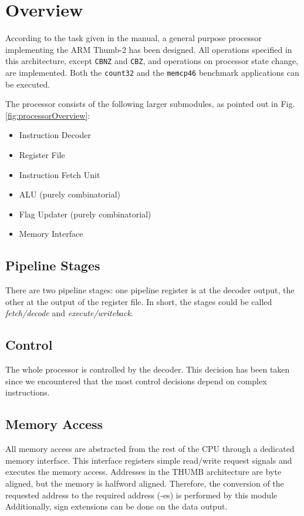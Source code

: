 
\section{Overview}
\label{sec:overview}


According to the task given in the manual, a general purpose processor implementing the ARM Thumb-2 has been designed. All operations specified in this architecture, except \texttt{CBNZ} and \texttt{CBZ}, and operations on processor state change, are implemented. Both the \texttt{count32} and the \texttt{memcp46} benchmark applications can be executed.

The processor consists of the following larger submodules, as pointed out in Fig. \ref{fig:processorOverview}:
\begin{itemize}
\itemsep-1em 
\item Instruction Decoder
\item Register File
\item Instruction Fetch Unit
\item ALU (purely combinatorial)
\item Flag Updater (purely combinatorial)
\item Memory Interface
\end{itemize}

\subsection{Pipeline Stages}
There are two pipeline stages: one pipeline register is at the decoder output, the other at the output of the register file. In short, the stages could be called \textit{fetch/decode} and \textit{execute/writeback}.

\subsection{Control}
The whole processor is controlled by the decoder. This decision has been taken since we encountered that the most control decisions depend on complex instructions.

\subsection{Memory Access}
All memory access are abstracted from the rest of the CPU through a dedicated memory interface. This interface registers simple read/write request signals and executes the memory access. Addresses in the THUMB architecture are byte aligned, but the memory is halfword aligned. Therefore, the conversion of the requested address to the required address (-es) is performed by this module Additionally, sign extensions can be done on the data output.

